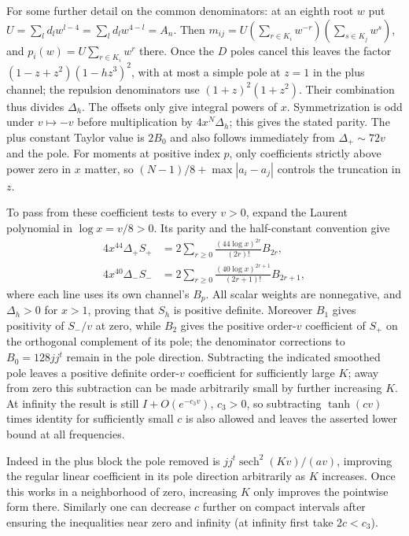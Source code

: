For some further detail on the common denominators: at an eighth root \(w\) put \(U=\sum_l d_l w^{l-4}=\sum_l d_l w^{4-l}=A_n\). Then \(m_{ij}=U(\sum_{r\in K_i}w^{-r})(\sum_{s\in K_j}w^s)\), and \(p_i(w)=U\sum_{r\in K_i}w^r\) there. Once the \(D\) poles cancel this leaves the factor \((1-z+z^2)(1-hz^3)^2\), with at most a simple pole at \(z=1\) in the plus channel; the repulsion denominators use \((1+z)^2(1+z^2)\). Their combination thus divides \(\Delta_h\). The offsets only give integral powers of \(x\). Symmetrization is odd under \(v\mapsto-v\) before multiplication by \(4x^N\Delta_h\); this gives the stated parity. The plus constant Taylor value is \(2B_0\) and also follows immediately from \(\Delta_+\sim72v\) and the pole. For moments at positive index \(p\), only coefficients strictly above power zero in \(x\) matter, so \((N-1)/8+\max|a_i-a_j|\) controls the truncation in \(z\).

To pass from these coefficient tests to every \(v>0\), expand the Laurent polynomial in \(\log x=v/8>0\). Its parity and the half-constant convention give
\[
 \begin{split}
 4x^{44}\Delta_+S_+&=2\sum_{r\ge0}
       \frac{(44\log x)^{2r}}{(2r)!}B_{2r},\\
 4x^{40}\Delta_-S_-&=2\sum_{r\ge0}
       \frac{(40\log x)^{2r+1}}{(2r+1)!}B_{2r+1},
 \end{split}
\]
where each line uses its own channel's \(B_p\). All scalar weights are nonnegative, and \(\Delta_h>0\) for \(x>1\), proving that \(S_h\) is positive definite. Moreover \(B_1\) gives positivity of \(S_-/v\) at zero, while \(B_2\) gives the positive order-\(v\) coefficient of \(S_+\) on the orthogonal complement of its pole; the denominator corrections to \(B_0=128jj^t\) remain in the pole direction. Subtracting the indicated smoothed pole leaves a positive definite order-\(v\) coefficient for sufficiently large \(K\); away from zero this subtraction can be made arbitrarily small by further increasing \(K\). At infinity the result is still \(I+O(e^{-c_3 v})\), \(c_3>0\), so subtracting \(\tanh(c v)\) times identity for sufficiently small \(c\) is also allowed and leaves the asserted lower bound at all frequencies.

Indeed in the plus block the pole removed is \(j j^t\operatorname{sech}^2(Kv)/(a v)\), improving the regular linear coefficient in its pole direction arbitrarily as \(K\) increases. Once this works in a neighborhood of zero, increasing \(K\) only improves the pointwise form there. Similarly one can decrease \(c\) further on compact intervals after ensuring the inequalities near zero and infinity (at infinity first take \(2c<c_3\)).


